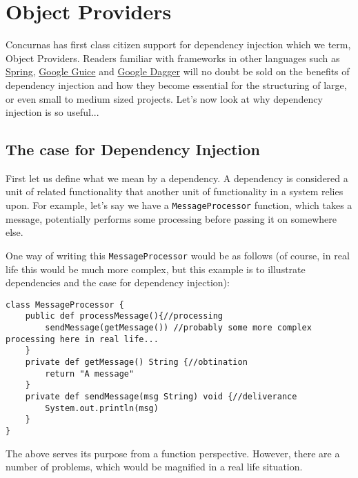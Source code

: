 \documentclass[conc-doc]{subfiles}
\begin{document}
	
	\chapter[Object Providers]{Object Providers}
	\label{ch:ObjProviders}


Concurnas has first class citizen support for dependency injection which we term, Object Providers. Readers familiar with frameworks in other languages such as \href{https://spring.io}{Spring}, \href{https://github.com/google/guice}{Google Guice} and \href{https://github.com/google/dagger}{Google Dagger} will no doubt be sold on the benefits of dependency injection and how they become essential for the structuring of large, or even small to medium sized projects. Let's now look at why dependency injection is so useful...


\section{The case for Dependency Injection}
First let us define what we mean by a dependency. A dependency is considered a unit of related functionality that another unit of functionality in a system relies upon. For example, let's say we have a \lstinline{MessageProcessor} function, which takes a message, potentially performs some processing before passing it on somewhere else. 

One way of writing this \lstinline{MessageProcessor} would be as follows (of course, in real life this would be much more complex, but this example is to illustrate dependencies and the case for dependency injection):
\begin{lstlisting}
class MessageProcessor {
	public def processMessage(){//processing
		sendMessage(getMessage()) //probably some more complex processing here in real life...
	}
	private def getMessage() String {//obtination
		return "A message"
	}
	private def sendMessage(msg String) void {//deliverance
		System.out.println(msg)
	}
}
\end{lstlisting}

The above serves its purpose from a function perspective. However, there are a number of problems, which would be magnified in a real life situation. 
\end{document}
